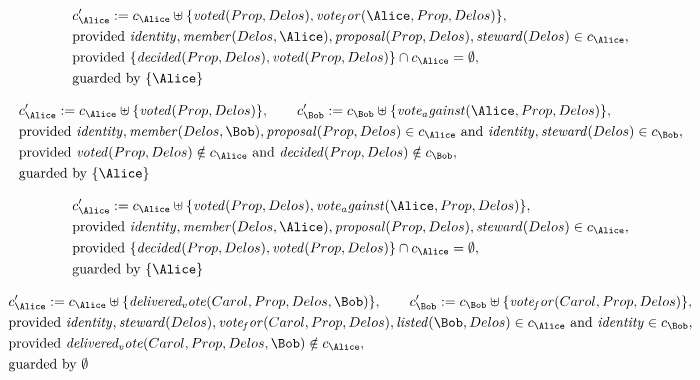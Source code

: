 \begin{align*}
&
c'_
{
\Alice
}
 := 
c_
{
\Alice
}
 \uplus 
\{
\mathit{
voted
}
(
Prop
,
Delos
)
,
\mathit{
vote_for
}
(
\Alice
,
Prop
,
Delos
)
\}
,\\
&
\text{provided } 
\mathit{
identity
}
,
\mathit{
member
}
(
Delos
,
\Alice
)
,
\mathit{
proposal
}
(
Prop
,
Delos
)
,
\mathit{
steward
}
(
Delos
)
 \in c_
{
\Alice
}
,\\
&
\text{provided } 
\{
\mathit{
decided
}
(
Prop
,
Delos
)
,
\mathit{
voted
}
(
Prop
,
Delos
)
\}
 \cap c_
{
\Alice
}
 = \emptyset
,\\
&
\text{guarded by } \{
\Alice
\}
\end{align*}

\begin{align*}
&
c'_
{
\Alice
}
 := 
c_
{
\Alice
}
 \uplus 
\{
\mathit{
voted
}
(
Prop
,
Delos
)
\}
, \qquad 
c'_
{
\Bob
}
 := 
c_
{
\Bob
}
 \uplus 
\{
\mathit{
vote_against
}
(
\Alice
,
Prop
,
Delos
)
\}
,\\
&
\text{provided } 
\mathit{
identity
}
,
\mathit{
member
}
(
Delos
,
\Bob
)
,
\mathit{
proposal
}
(
Prop
,
Delos
)
 \in c_
{
\Alice
}
 \text{ and } 
\mathit{
identity
}
,
\mathit{
steward
}
(
Delos
)
 \in c_
{
\Bob
}
,\\
&
\text{provided } 
\mathit{
voted
}
(
Prop
,
Delos
)
 \notin c_
{
\Alice
}
 \text{ and } 
\mathit{
decided
}
(
Prop
,
Delos
)
 \notin c_
{
\Bob
}
,\\
&
\text{guarded by } \{
\Alice
\}
\end{align*}

\begin{align*}
&
c'_
{
\Alice
}
 := 
c_
{
\Alice
}
 \uplus 
\{
\mathit{
voted
}
(
Prop
,
Delos
)
,
\mathit{
vote_against
}
(
\Alice
,
Prop
,
Delos
)
\}
,\\
&
\text{provided } 
\mathit{
identity
}
,
\mathit{
member
}
(
Delos
,
\Alice
)
,
\mathit{
proposal
}
(
Prop
,
Delos
)
,
\mathit{
steward
}
(
Delos
)
 \in c_
{
\Alice
}
,\\
&
\text{provided } 
\{
\mathit{
decided
}
(
Prop
,
Delos
)
,
\mathit{
voted
}
(
Prop
,
Delos
)
\}
 \cap c_
{
\Alice
}
 = \emptyset
,\\
&
\text{guarded by } \{
\Alice
\}
\end{align*}

\begin{align*}
&
c'_
{
\Alice
}
 := 
c_
{
\Alice
}
 \uplus 
\{
\mathit{
delivered_vote
}
(
Carol
,
Prop
,
Delos
,
\Bob
)
\}
, \qquad 
c'_
{
\Bob
}
 := 
c_
{
\Bob
}
 \uplus 
\{
\mathit{
vote_for
}
(
Carol
,
Prop
,
Delos
)
\}
,\\
&
\text{provided } 
\mathit{
identity
}
,
\mathit{
steward
}
(
Delos
)
,
\mathit{
vote_for
}
(
Carol
,
Prop
,
Delos
)
,
\mathit{
listed
}
(
\Bob
,
Delos
)
 \in c_
{
\Alice
}
 \text{ and } 
\mathit{
identity
}
 \in c_
{
\Bob
}
,\\
&
\text{provided } 
\mathit{
delivered_vote
}
(
Carol
,
Prop
,
Delos
,
\Bob
)
 \notin c_
{
\Alice
}
,\\
&
\text{guarded by } \emptyset
\end{align*}
